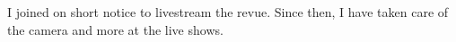 
I joined on short notice to livestream the revue. Since then, I have taken care of the camera and more at
the live shows.
